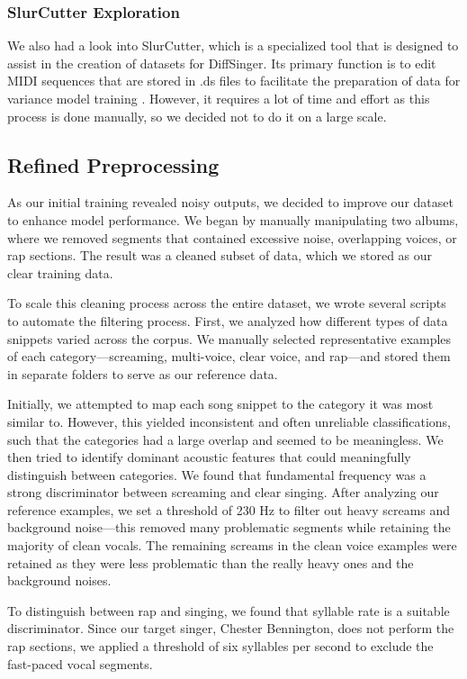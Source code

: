 \documentclass[a4paper]{article}
\begin{document}
	\subsubsection{SlurCutter Exploration}
	We also had a look into SlurCutter, which is a specialized tool that is designed to assist in the creation of datasets for DiffSinger. Its primary function is to edit MIDI sequences that are stored in .ds files to facilitate the preparation of data for variance model training \cite{openvpi}. However, it requires a lot of time and effort as this process is done manually, so we decided not to do it on a large scale.
	
	
	
	\subsection{Refined Preprocessing}
	As our initial training revealed noisy outputs, we decided to improve our dataset to enhance model performance. We began by manually manipulating two albums, where we removed segments that contained excessive noise, overlapping voices, or rap sections. The result was a cleaned subset of data, which we stored as our clear training data.
	
	To scale this cleaning process across the entire dataset, we wrote several scripts to automate the filtering process. First, we analyzed how different types of data snippets varied across the corpus. We manually selected representative examples of each category—screaming, multi-voice, clear voice, and rap—and stored them in separate folders to serve as our reference data.
	
	Initially, we attempted to map each song snippet to the category it was most similar to. However, this yielded inconsistent and often unreliable classifications, such that the categories had a large overlap and seemed to be meaningless. We then tried to identify dominant acoustic features that could meaningfully distinguish between categories. We found that fundamental frequency was a strong discriminator between screaming and clear singing. After analyzing our reference examples, we set a threshold of 230 Hz to filter out heavy screams and background noise—this removed many problematic segments while retaining the majority of clean vocals. The remaining screams in the clean voice examples were retained as they were less problematic than the really heavy ones and the background noises.
	
	To distinguish between rap and singing, we found that syllable rate is a suitable discriminator. Since our target singer, Chester Bennington, does not perform the rap sections, we applied a threshold of six syllables per second to exclude the fast-paced vocal segments.
	
\end{document}
